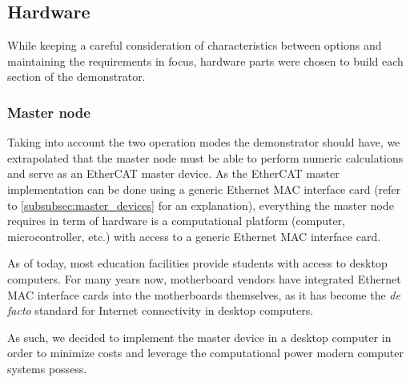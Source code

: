 \subsection{Hardware} \label{sec:proposed-hardware}

While keeping a careful consideration of characteristics between options and maintaining the requirements in focus, hardware parts were chosen to build each section of the demonstrator.

\subsubsection{Master node}

Taking into account the two operation modes the demonstrator should have, we extrapolated that the master node must be able to perform numeric calculations and serve as an EtherCAT master device.
As the EtherCAT master implementation can be done using a generic Ethernet MAC interface card (refer to \ref{subsubsec:master_devices} for an explanation), everything the master node requires in term of hardware is a computational platform (computer, microcontroller, etc.) with access to a generic Ethernet MAC interface card.

As of today, most education facilities provide students with access to desktop computers.
For many years now, motherboard vendors have integrated Ethernet MAC interface cards into the motherboards themselves, as it has become the \emph{de facto} standard for Internet connectivity in desktop computers.

As such, we decided to implement the master device in a desktop computer in order to minimize costs and leverage the computational power modern computer systems possess.
